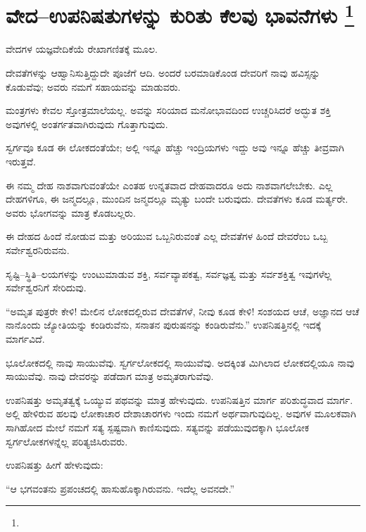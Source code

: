 
\vspace{-0.6cm}

\chapter[ವೇದ–ಉಪನಿಷತುಗಳನ್ನು ಕುರಿತು ಕೆಲವು ಭಾವನೆಗಳು ]{ವೇದ–ಉಪನಿಷತುಗಳನ್ನು ಕುರಿತು ಕೆಲವು ಭಾವನೆಗಳು \protect\footnote{}}

ವೇದಗಳ ಯಜ್ಞವೇದಿಕೆಯೆ ರೇಖಾಗಣಿತಕ್ಕೆ  ಮೂಲ.

ದೇವತೆಗಳನ್ನು ಆಹ್ವಾನಿಸುತ್ತಿದ್ದುದೇ ಪೂಜೆಗೆ ಆದಿ. ಅಂದರೆ ಬರಮಾಡಿಕೊಂಡ ದೇವರಿಗೆ ನಾವು ಹವಿಸ್ಸನ್ನು ಕೊಡುವೆವು; ಅವರು ನಮಗೆ ಸಹಾಯವನ್ನು ಮಾಡುವರು.

ಮಂತ್ರಗಳು ಕೇವಲ ಸ್ತೋತ್ರಮಾಲೆಯಲ್ಲ. ಅವನ್ನು ಸರಿಯಾದ ಮನೋಭಾವದಿಂದ ಉಚ್ಚರಿಸಿದರೆ ಅದ್ಭುತ ಶಕ್ತಿ ಅವುಗಳಲ್ಲಿ ಅಂತರ್ಗತವಾಗಿರುವುದು ಗೊತ್ತಾಗುವುದು.

ಸ್ವರ್ಗವೂ ಕೂಡ ಈ ಲೋಕದಂತೆಯೇ; ಅಲ್ಲಿ ಇನ್ನೂ ಹೆಚ್ಚು ಇಂದ್ರಿಯಗಳು ಇದ್ದು ಅವು ಇನ್ನೂ ಹೆಚ್ಚು ತೀವ್ರವಾಗಿ ಇರುತ್ತವೆ.

ಈ ನಮ್ಮ ದೇಹ ನಾಶವಾಗುವಂತೆಯೇ ಎಂತಹ ಉನ್ನತವಾದ ದೇಹವಾದರೂ ಅದು ನಾಶವಾಗಲೇಬೇಕು. ಎಲ್ಲ ದೇಹಗಳಿಗೂ, ಈ ಜನ್ಮದಲ್ಲೂ, ಮುಂದಿನ ಜನ್ಮದಲ್ಲೂ ಮೃತ್ಯು ಬಂದೇ ಬರುವುದು. ದೇವತೆಗಳು ಕೂಡ ಮರ್ತ್ಯರೇ. ಅವರು ಭೋಗವನ್ನು ಮಾತ್ರ ಕೊಡಬಲ್ಲರು.

ಈ ದೇಹದ ಹಿಂದೆ ನೋಡುವ ಮತ್ತು ಅರಿಯುವ ಒಬ್ಬನಿರುವಂತೆ ಎಲ್ಲ ದೇವತೆಗಳ ಹಿಂದೆ ದೇವರೆಂಬ ಒಬ್ಬ ಸರ್ವೇಶ್ವರನಿರುವನು.

ಸೃಷ್ಟಿ–ಸ್ಥಿತಿ–ಲಯಗಳನ್ನು ಉಂಟುಮಾಡುವ ಶಕ್ತಿ, ಸರ್ವವ್ಯಾಪಕತ್ವ, ಸರ್ವಜ್ಞತ್ವ ಮತ್ತು ಸರ್ವಶಕ್ತಿತ್ವ ಇವುಗಳೆಲ್ಲ ಸರ್ವೇಶ್ವರನಿಗೆ ಸೇರಿದುವು.

\vskip 5pt

“ಅಮೃತ ಪುತ್ರರೇ ಕೇಳಿ! ಮೇಲಿನ ಲೋಕದಲ್ಲಿರುವ ದೇವತೆಗಳೆ, ನೀವು ಕೂಡ ಕೇಳಿ! ಸಂಶಯದ ಆಚೆ, ಅಜ್ಞಾನದ ಆಚೆ ನಾನೊಂದು ಜ್ಯೋತಿಯನ್ನು ಕಂಡಿರುವೆನು, ಸನಾತನ ಪುರುಷನನ್ನು ಕಂಡಿರುವೆನು.” ಉಪನಿಷತ್ತಿನಲ್ಲಿ ಇದಕ್ಕೆ ಮಾರ್ಗವಿದೆ.

\vskip 5pt

ಭೂಲೋಕದಲ್ಲಿ ನಾವು ಸಾಯುವೆವು. ಸ್ವರ್ಗಲೋಕದಲ್ಲಿ ಸಾಯುವೆವು. ಅದಕ್ಕಿಂತ ಮಿಗಿಲಾದ ಲೋಕದಲ್ಲಿಯೂ ನಾವು ಸಾಯುವೆವು. ನಾವು ದೇವರನ್ನು ಪಡೆದಾಗ ಮಾತ್ರ ಅಮೃತರಾಗುವೆವು.

\vskip 5pt

ಉಪನಿಷತ್ತು ಅಮೃತತ್ವಕ್ಕೆ ಒಯ್ಯುವ ಪಥವನ್ನು ಮಾತ್ರ ಹೇಳುವುದು. ಉಪನಿಷತ್ತಿನ ಮಾರ್ಗ ಪರಿಶುದ್ಧವಾದ ಮಾರ್ಗ. ಅಲ್ಲಿ ಹೇಳಿರುವ ಹಲವು ಲೋಕಾಚಾರ ದೇಶಾಚಾರಗಳು ಇಂದು ನಮಗೆ ಅರ್ಥವಾಗುವುದಿಲ್ಲ. ಅವುಗಳ ಮೂಲಕವಾಗಿ ಸಾಗಿಹೋದ ಮೇಲೆ ನಮಗೆ ಸತ್ಯ ಸ್ಪಷ್ಟವಾಗಿ ಕಾಣಿಸುವುದು. ಸತ್ಯವನ್ನು ಪಡೆಯುವುದಕ್ಕಾಗಿ ಭೂಲೋಕ ಸ್ವರ್ಗಲೋಕಗಳನ್ನೆಲ್ಲ ಪರಿತ್ಯಜಿಸಿರುವರು.

\vskip 5pt

ಉಪನಿಷತ್ತು ಹೀಗೆ ಹೇಳುವುದು:

“ಆ ಭಗವಂತನು ಪ್ರಪಂಚದಲ್ಲಿ ಹಾಸುಹೊಕ್ಕಾಗಿರುವನು. ಇದೆಲ್ಲ ಅವನದೇ.”

